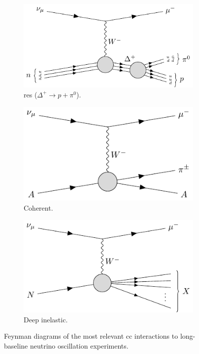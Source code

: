 \begin{figure}[t]
	\begin{subfigure}{0.5\textwidth}
		\centering
		\includegraphics[width=.90\linewidth]{Images//Nu/feynman_ccres_delta+.pdf}
		\caption{\gls{res} ($\Delta^{+} \rightarrow p + \pi^{0}$).}
	\end{subfigure}
	\begin{subfigure}{0.5\textwidth}
		\centering
		\includegraphics[width=.90\linewidth]{Images//Nu/feynman_cccoh.pdf}
		\caption{Coherent.}
	\end{subfigure}
	\begin{subfigure}{0.5\textwidth}
		\centering
		\includegraphics[width=.90\linewidth]{Images//Nu/feynman_ccdis.pdf}
		\caption{Deep inelastic.}
	\end{subfigure}
	\caption{Feynman diagrams of the most relevant \gls{cc} interactions to long-baseline neutrino oscillation experiments.}
	\label{fig:neutrino_cc_interactions}
\end{figure}

